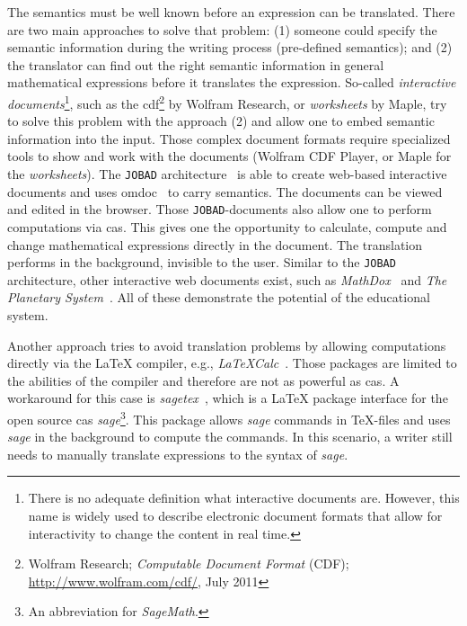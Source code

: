 \documentclass[a4paper,11pt]{article}
\newcommand{\Maple}{Maple}
\newcommand{\JOBAD}{{\tt JOBAD}}
\theoremstyle{defTheoStyle}
\theoremstyle{defExampStyle}
\begin{document}
The semantics must be well known before an expression can be translated. There are two main approaches to solve that problem: (1) someone could specify the semantic information during the writing process (pre-defined semantics); and (2) the translator can find out the right semantic information in general mathematical expressions before it translates the expression. So-called \textit{interactive documents}\footnote{There is no adequate definition what interactive documents are. However, this name is widely used to describe electronic document formats that allow for interactivity to change the content in real time.}, such as the \gls*{cdf}\footnote{Wolfram Research; \textit{Computable Document Format} (CDF); \url{http://www.wolfram.com/cdf/}, July 2011} by Wolfram Research, or \textit{worksheets} by \Maple{}, try to solve this problem with the approach (2) and allow one to embed semantic information into the input. Those complex document formats require specialized tools to show and work with the documents (Wolfram CDF Player, or \Maple{} for the \textit{worksheets}). The \JOBAD{} architecture~\parencite{JOBAD:orig} is able to create web-based interactive documents and uses \gls*{omdoc}~\parencite{OMDoc} to carry semantics. The documents can be viewed and edited in the browser. Those \JOBAD{-documents} also allow one to perform computations via \gls*{cas}. This gives one the opportunity to calculate, compute and change mathematical expressions directly in the document. The translation performs in the background, invisible to the user. Similar to the \JOBAD{} architecture, other interactive web documents exist, such as \textit{MathDox}~\parencite{MathDox} and \textit{The Planetary System}~\parencite{Planetary}. All of these demonstrate the potential of the educational system.

Another approach tries to avoid translation problems by allowing computations directly via the \LaTeX{} compiler, e.g., \textit{LaTeXCalc}~\parencite{LatexCalc}. Those packages are limited to the abilities of the compiler and therefore are not as powerful as \gls*{cas}. A workaround for this case is \textit{sagetex}~\parencite{Sagetex}, which is a \LaTeX{} package interface for the open source \gls*{cas} \textit{sage}\footnote{An abbreviation for \textit{SageMath}.}. This package allows \textit{sage} commands in \TeX{-}files and uses \textit{sage} in the background to compute the commands. In this scenario, a writer still needs to manually translate expressions to the syntax of \textit{sage}.
\end{document}
